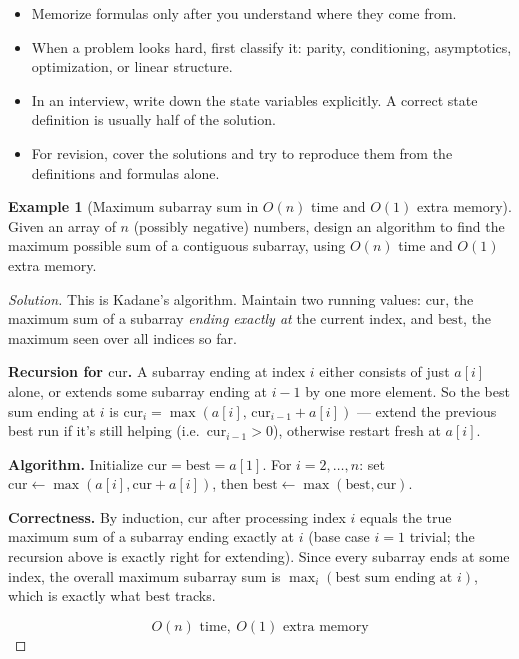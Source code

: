 \documentclass[11pt]{article}
\theoremstyle{definition}
\newtheorem{example}{Example}[section]
\begin{document}
\begin{itemize}
    \item Memorize formulas only after you understand where they come from.
    \item When a problem looks hard, first classify it: parity, conditioning, asymptotics, optimization, or linear structure.
    \item In an interview, write down the state variables explicitly. A correct state definition is usually half of the solution.
    \item For revision, cover the solutions and try to reproduce them from the definitions and formulas alone.
\end{itemize}

\begin{example}[Maximum subarray sum in $O(n)$ time and $O(1)$ extra memory]
Given an array of $n$ (possibly negative) numbers, design an algorithm to find the maximum possible sum of a contiguous subarray, using $O(n)$ time and $O(1)$ extra memory.
\end{example}
\begin{proof}[Solution]
This is Kadane's algorithm. Maintain two running values: $\mathrm{cur}$, the maximum sum of a subarray \emph{ending exactly at} the current index, and $\mathrm{best}$, the maximum seen over all indices so far.

\textbf{Recursion for $\mathrm{cur}$.} A subarray ending at index $i$ either consists of just $a[i]$ alone, or extends some subarray ending at $i-1$ by one more element. So the best sum ending at $i$ is $\mathrm{cur}_i=\max(a[i],\,\mathrm{cur}_{i-1}+a[i])$ — extend the previous best run if it's still helping (i.e.\ $\mathrm{cur}_{i-1}>0$), otherwise restart fresh at $a[i]$.

\textbf{Algorithm.} Initialize $\mathrm{cur}=\mathrm{best}=a[1]$. For $i=2,\dots,n$: set $\mathrm{cur}\leftarrow\max(a[i],\mathrm{cur}+a[i])$, then $\mathrm{best}\leftarrow\max(\mathrm{best},\mathrm{cur})$.

\textbf{Correctness.} By induction, $\mathrm{cur}$ after processing index $i$ equals the true maximum sum of a subarray ending exactly at $i$ (base case $i=1$ trivial; the recursion above is exactly right for extending). Since every subarray ends at some index, the overall maximum subarray sum is $\max_i(\text{best sum ending at }i)$, which is exactly what $\mathrm{best}$ tracks.

\[
\boxed{O(n)\text{ time},\ O(1)\text{ extra memory}}
\]
\end{proof}
\end{document}
